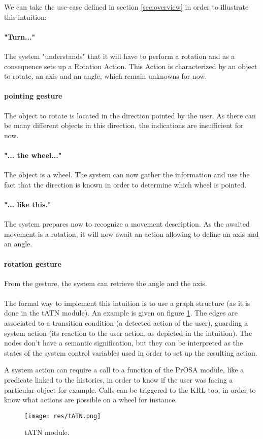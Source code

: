 \documentclass[a4paper]{article}
\begin{document}
We can take the use-case defined in section \ref{sec:overview} in order to illustrate this intuition:

\paragraph{"Turn..."} The system "understands" that it will have to perform a rotation and as a consequence sets up a Rotation Action. This Action is characterized by an object to rotate, an axis and an angle, which remain unknowns for now.

\paragraph{pointing gesture} The object to rotate is located in the direction pointed by the user. As there can be many different objects in this direction, the indications are insufficient for now.

\paragraph{"... the wheel..."} The object is a wheel. The system can now gather the information and use the fact that the direction is known in order to determine which wheel is pointed.

\paragraph{"... like this."} The system prepares now to recognize a movement description. As the awaited movement is a rotation, it will now await an action allowing to define an axis and an angle.

\paragraph{rotation gesture} From the gesture, the system can retrieve the angle and the axis.
\\
\\
The formal way to implement this intuition is to use a graph structure (as it is done in the tATN module). An example is given on figure \ref{fig:tATN}. The edges are associated to a transition condition (a detected action of the user), guarding a system action (its reaction to the user action, as depicted in the intuition). The nodes don't have a semantic signification, but they can be interpreted as the states of the system control variables used in order to set up the resulting action.

A system action can require a call to a function of the PrOSA module, like a predicate linked to the histories, in order to know if the user was facing a particular object for example. Calls can be triggered to the KRL too, in order to know what actions are possible on a wheel for instance.

\begin{figure}
\centering
\texttt{[image: res/tATN.png]}
\caption{\label{fig:tATN}tATN module.}
\end{figure}
\end{document}
